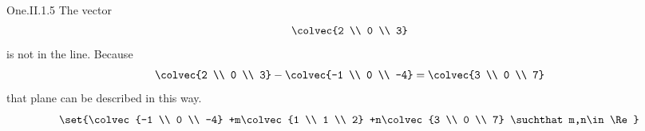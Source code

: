 \begin{ans}{One.II.1.5}
      The vector
      \begin{equation*}
        \colvec{2 \\ 0 \\ 3}
      \end{equation*}
      is not in the line.
      Because
      \begin{equation*}
        \colvec{2 \\ 0 \\ 3}
        -\colvec{-1 \\ 0 \\ -4}
        =\colvec{3 \\ 0 \\ 7}
      \end{equation*}
      that plane can be described in this way.
      \begin{equation*}
        \set{\colvec{-1 \\ 0 \\ -4}
             +m\colvec{1 \\ 1 \\ 2}
             +n\colvec{3 \\ 0 \\ 7}
            \suchthat m,n\in\Re}
      \end{equation*}
   
\end{ans}
